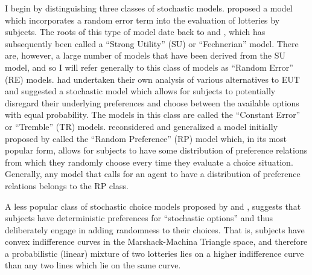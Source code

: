 \documentclass[../main.tex]{subfiles}
\begin{document}
I begin by distinguishing three classes of stochastic models.
\textcite[1301]{Hey1994} proposed a model which incorporates a random error term into the evaluation of lotteries by subjects.
The roots of this type of model date back to \textcite{Fechner1966a} and \textcite{Luce1959}, which has subsequently been called a \enquote{Strong Utility} (SU) or \enquote{Fechnerian} model.
There are, however, a large number of models that have been derived from the SU model, and so I will refer generally to this class of models as \enquote{Random Error} (RE) models.
\textcite{Harless1994} had undertaken their own analysis of various alternatives to EUT and suggested a stochastic model which allows for subjects to potentially disregard their underlying preferences and choose between the available options with equal probability.
The models in this class are called the \enquote{Constant Error} or \enquote{Tremble} (TR) models.
\textcite{Loomes1995} reconsidered and generalized a model initially proposed by \textcite{Becker1963} called the \enquote{Random Preference} (RP) model which, in its most popular form, allows for subjects to have some distribution of preference relations from which they randomly choose every time they evaluate a choice situation.
Generally, any model that calls for an agent to have a distribution of preference relations belongs to the RP class.{\footnotemark}

\addtocounter{footnote}{-1}

A less popular class of stochastic choice models proposed by \textcite{Machina1985} and \textcite{Chew1991}, suggests that subjects have deterministic preferences for \enquote{stochastic options} and thus deliberately engage in adding randomness to their choices.
That is, subjects have convex indifference curves in the Marshack-Machina Triangle space,{\footnotemark} and therefore a probabilistic (linear) mixture of two lotteries lies on a higher indifference curve than any two lines which lie on the same curve.
\end{document}
